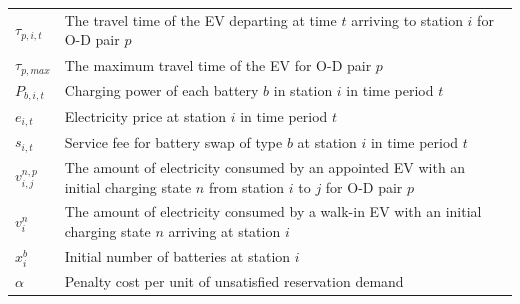 \documentclass[12pt,hyperref,a4paper,UTF8]{ctexart}
\begin{document}
\begin{table}[!htbp]
\begin{tabular}{@{}lp{13cm}@{}}
    $\tau_{p,i,t}$ & The travel time of the EV departing at time $t$ arriving to station $i$ for O-D pair $p$\\
    $\tau_{p,max}$ & The maximum travel time of the EV for O-D pair $p$\\
    $P_{b,i,t}$ & Charging power of each battery $b$ in station $i$ in time period $t$\\
    $e_{i,t}$ & Electricity price at station $i$ in time period $t$\\
    $s_{i,t}$ & Service fee for battery swap of type $b$ at station $i$ in time period $t$\\
    $v^{n,p}_{i,j}$ & The amount of electricity consumed by an appointed EV with an initial charging state $n$ from station $i$ to $j$ for O-D pair $p$\\
    $v^{n}_{i}$ & The amount of electricity consumed by a walk-in EV with an initial charging state $n$ arriving at station $i$\\
    $x_i^b$ & Initial number of batteries at station $i$ \\
    $\alpha$ & Penalty cost per unit of unsatisfied reservation demand\\

\end{tabular}
\end{table}
\end{document}
